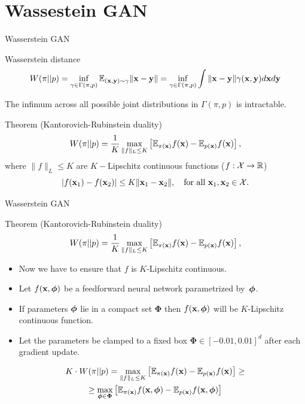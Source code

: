 \section{Wassestein GAN}
\begin{frame}{Wasserstein GAN}
	\begin{block}{Wasserstein distance}
		\vspace{-0.4cm}
		\[
			W(\pi || p) = \inf_{\gamma \in \Gamma(\pi, p)} \mathbb{E}_{(\mathbf{x}, \mathbf{y}) \sim \gamma} \| \mathbf{x} - \mathbf{y} \| =  \inf_{\gamma \in \Gamma(\pi, p)} \int \| \mathbf{x} - \mathbf{y} \| \gamma (\mathbf{x}, \mathbf{y}) d \mathbf{x} d \mathbf{y}
		\]
	\end{block}
	The infimum across all possible joint distributions in $\Gamma(\pi, p)$ is intractable.
	\begin{block}{Theorem (Kantorovich-Rubinstein duality)}
		\[
			W(\pi || p) = \frac{1}{K} \max_{\| f \|_L \leq K} \left[ \mathbb{E}_{\pi(\mathbf{x})} f(\mathbf{x})  - \mathbb{E}_{p(\mathbf{x})} f(\mathbf{x})\right],
		\]
		where $\| f \|_L \leq K$ are $K-$Lipschitz continuous functions ($f: \mathcal{X} \rightarrow \mathbb{R}$)
		\[
			|f(\mathbf{x}_1) - f(\mathbf{x}_2)| \leq K \| \mathbf{x}_1 - \mathbf{x}_2 \|, \quad \text{for all } \mathbf{x}_1, \mathbf{x}_2 \in \mathcal{X}.
		\]
	\end{block}

\end{frame}
\begin{frame}{Wasserstein GAN}
		\begin{block}{Theorem (Kantorovich-Rubinstein duality)}
		\[
			W(\pi || p) = \frac{1}{K} \max_{\| f \|_L \leq K} \left[ \mathbb{E}_{\pi(\mathbf{x})} f(\mathbf{x})  - \mathbb{E}_{p(\mathbf{x})} f(\mathbf{x})\right],
		\]
	\end{block}
	\begin{itemize}
		\item Now we have to ensure that $f$ is $K$-Lipschitz continuous.
		\item Let $f(\mathbf{x}, \boldsymbol{\phi})$ be a feedforward neural network parametrized by~$\boldsymbol{\phi}$.
		\item If parameters $\boldsymbol{\phi}$ lie in a compact set $\boldsymbol{\Phi}$ then $f(\mathbf{x}, \boldsymbol{\phi})$ will be $K$-Lipschitz continuous function. 
		\item Let the parameters be clamped to a fixed box $\boldsymbol{\Phi} \in [-0.01, 0.01]^d$ after each gradient update.
	\end{itemize}
	\begin{multline*}
		 K \cdot W(\pi || p) = \max_{\| f \|_L \leq K} \left[ \mathbb{E}_{\pi(\mathbf{x})} f(\mathbf{x})  - \mathbb{E}_{p(\mathbf{x})} f(\mathbf{x})\right] \geq \\  \geq \max_{\boldsymbol{\phi} \in \boldsymbol{\Phi}} \left[ \mathbb{E}_{\pi(\mathbf{x})} f(\mathbf{x}, \boldsymbol{\phi})  - \mathbb{E}_{p(\mathbf{x})} f(\mathbf{x}, \boldsymbol{\phi} )\right]
	\end{multline*}

\end{frame}
